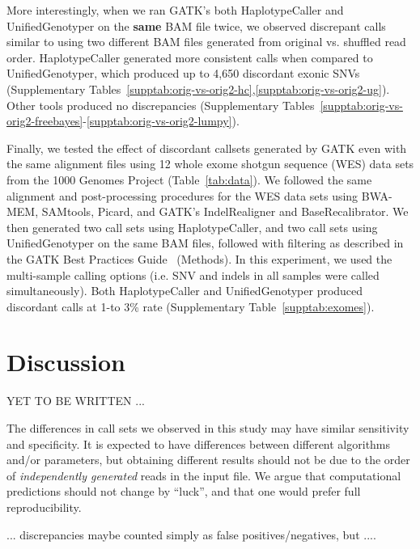 \documentclass[10pt,a4paper]{article}
\begin{document}
More interestingly, when we ran GATK's both HaplotypeCaller and UnifiedGenotyper on the {\bf same} BAM file twice, we observed discrepant calls similar to using two different BAM files generated from original vs. shuffled read order. HaplotypeCaller generated more consistent calls when compared to UnifiedGenotyper, which produced up to 4,650 discordant exonic SNVs (Supplementary Tables~\ref{supptab:orig-vs-orig2-hc},\ref{supptab:orig-vs-orig2-ug}). Other tools produced no discrepancies (Supplementary Tables~\ref{supptab:orig-vs-orig2-freebayes}-\ref{supptab:orig-vs-orig2-lumpy}).

Finally, we tested the effect of discordant callsets generated by GATK even with the same alignment files using 12 whole exome shotgun sequence (WES) data sets from the 1000 Genomes Project (Table~\ref{tab:data}). We followed the same alignment and post-processing procedures for the WES data sets using BWA-MEM, SAMtools, Picard, and GATK's IndelRealigner and BaseRecalibrator. We then generated two call sets using HaplotypeCaller, and two call sets using UnifiedGenotyper on the same BAM files, followed with filtering as described in the GATK Best Practices Guide~\cite{VanderAuwera2013} (Methods). In this experiment, we used the multi-sample calling options (i.e. SNV and indels in all samples were called simultaneously). Both HaplotypeCaller and UnifiedGenotyper produced discordant calls at 1-to 3\% rate
(Supplementary Table~\ref{supptab:exomes}). 

\section{Discussion}

YET TO BE WRITTEN ...

The differences in call sets we observed in this study 
may have similar sensitivity and specificity. It is expected to
have differences between different algorithms and/or parameters, but
obtaining different results should not be due to the order of {\it independently generated} reads in the input file. 
We argue that computational predictions should not change by ``luck'', and that 
one would prefer full reproducibility. 

... discrepancies maybe counted simply as false positives/negatives, but ....


\small






\end{document}
